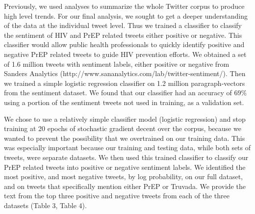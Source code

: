 \documentclass{sig-alternate-05-2015}
\begin{document}
Previously, we used analyses to summarize the whole Twitter corpus to produce high level trends. For our final analysis, we sought to get a deeper understanding of the data at the individual tweet level. Thus we trained a classifier to classify the sentiment of HIV and PrEP related tweets either positive or negative. This classifier would allow public health professionals to quickly identify positive and negative PrEP related tweets to guide HIV prevention efforts. We obtained a set of 1.6 million tweets with sentiment labels, either positive or negative from Sanders Analytics (http://www.sananalytics.com/lab/twitter-sentiment/). Then we trained a simple logistic regression classifier on 1.2 million paragraph-vectors from the sentiment dataset. We found that our classifier had an accuracy of 69\% using a portion of the sentiment tweets not used in training, as a validation set.

We chose to use a relatively simple classifier model (logistic regression) and stop training at 20 epochs of stochastic gradient decent over the corpus, because we wanted to prevent the possibility that we overtrained on our training data. This was especially important because our training and testing data, while both sets of tweets, were separate datasets. We then used this trained classifier to classify our PrEP related tweets into positive or negative sentiment labels. We identified the most positive, and most negative tweets, by log probability, on our full dataset, and on tweets that specifically mention either PrEP or Truvada. We provide the text from the top three positive and negative tweets from each of the three datasets (Table 3, Table 4).
\end{document}
